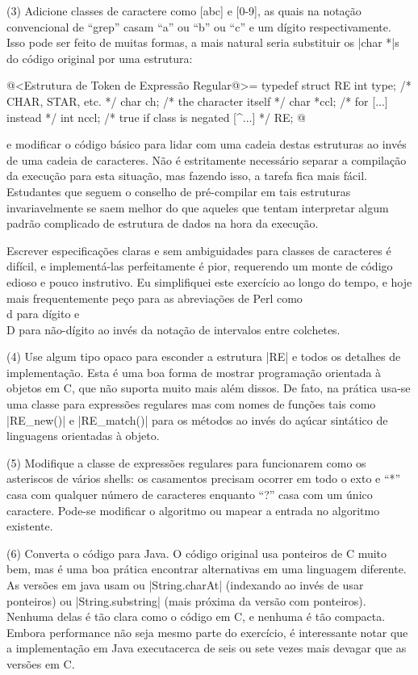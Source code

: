 (3) Adicione classes de caractere como [abc] e [0-9], as quais na
notação convencional de ``grep'' casam ``a'' ou ``b'' ou ``c'' e um
dígito respectivamente. Isso pode ser feito de muitas formas, a mais
natural seria substituir os |char *|s do código original
por uma estrutura:

@<Estrutura de Token de Expressão Regular@>=
typedef struct RE {
  int     type;   /* CHAR, STAR, etc. */
  char    ch;     /* the character itself */
  char    *ccl;   /* for [...] instead */
  int     nccl;   /* true if class is negated [^...] */
} RE;
@

e modificar o código básico para lidar com uma cadeia destas
estruturas ao invés de uma cadeia de caracteres. Não é estritamente
necessário separar a compilação da execução para esta situação, mas
fazendo isso, a tarefa fica mais fácil. Estudantes que seguem o
conselho de pré-compilar em tais estruturas invariavelmente se saem
melhor do que aqueles que tentam interpretar algum padrão complicado
de estrutura de dados na hora da execução.

Escrever especificações claras e sem ambiguidades para classes de
caracteres é difícil, e implementá-las perfeitamente é pior,
requerendo um monte de código edioso e pouco instrutivo. Eu
simplifiquei este exercício ao longo do tempo, e hoje mais
frequentemente peço para as abreviações de Perl como \\\/d para dígito
e \\\/D para não-dígito ao invés da notação de intervalos entre
colchetes.

(4) Use algum tipo opaco para esconder a estrutura |RE| e todos os
detalhes de implementação. Esta é uma boa forma de mostrar programação
orientada à objetos em C, que não suporta muito mais além dissos. De
fato, na prática usa-se uma classe para expressões regulares mas com
nomes de funções tais como |RE_new()| e |RE_match()| para os métodos
ao invés do açúcar sintático de linguagens orientadas à objeto.

(5) Modifique a classe de expressões regulares para funcionarem como
os asteriscos de vários shells: os casamentos precisam ocorrer em todo
o exto e ``*'' casa com qualquer número de caracteres enquanto ``?''
casa com um único caractere. Pode-se modificar o algoritmo ou mapear a
entrada no algoritmo existente.

(6) Converta o código para Java. O código original usa ponteiros de C
muito bem, mas é uma boa prática encontrar alternativas em uma
linguagem diferente. As versões em java usam ou |String.charAt|
(indexando ao invés de usar ponteiros) ou |String.substring| (mais
próxima da versão com ponteiros). Nenhuma delas é tão clara como o
código em C, e nenhuma é tão compacta. Embora performance não seja
mesmo parte do exercício, é interessante notar que a implementação em
Java executacerca de seis ou sete vezes mais devagar que as versões em
C.

